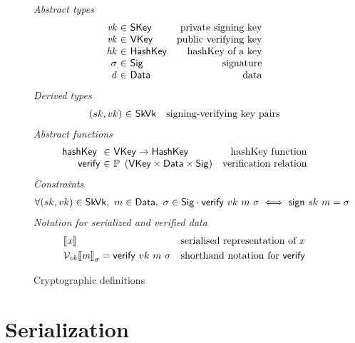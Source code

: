 \documentclass[11pt,a4paper]{article}
\newcommand{\VKey}{\type{VKey}}
\newcommand{\SKey}{\type{SKey}}
\newcommand{\HashKey}{\type{HashKey}}
\newcommand{\SkVk}{\type{SkVk}}
\newcommand{\Sig}{\type{Sig}}
\newcommand{\Data}{\type{Data}}
\newcommand{\verify}[3]{\fun{verify} ~ #1 ~ #2 ~ #3}
\newcommand{\sign}[2]{\fun{sign} ~ #1 ~ #2}
\newcommand{\serialised}[1]{\llbracket \var{#1} \rrbracket}
\newcommand{\hashKey}[1]{\fun{hashKey}~ \var{#1}}
\theoremstyle{definition}
\theoremstyle{definition}
\begin{document}
\begin{figure}
  \emph{Abstract types}
  \begin{equation*}
    \begin{array}{r@{~\in~}lr}
      \var{vk} & \SKey & \text{private signing key}\\
      \var{vk} & \VKey & \text{public verifying key}\\
      \var{hk} & \HashKey & \text{hashKey of a key}\\
      \sigma & \Sig  & \text{signature}\\
      \var{d} & \Data  & \text{data}\\
    \end{array}
  \end{equation*}
  \emph{Derived types}
  \begin{equation*}
    \begin{array}{r@{~\in~}lr}
      (sk, vk) & \SkVk & \text{signing-verifying key pairs}
    \end{array}
  \end{equation*}
  \emph{Abstract functions}
  \begin{equation*}
    \begin{array}{r@{~\in~}lr}
      \hashKey{} & \VKey \to \HashKey
      & \text{hashKey function} \\
      \fun{verify} & \powerset{\left(\VKey \times \Data \times \Sig\right)}
      & \text{verification relation}\\
    \end{array}
  \end{equation*}
  \emph{Constraints}
  \begin{align*}
    & \forall (sk, vk) \in \SkVk,~ m \in \Data,~ \sigma \in \Sig \cdot
      \verify{vk}{m}{\sigma} \iff \sign{sk}{m} = \sigma
  \end{align*}
  \emph{Notation for serialized and verified data}
  \begin{align*}
    & \serialised{x} & \text{serialised representation of } x\\
    & \mathcal{V}_{\var{vk}}{\serialised{m}}_{\sigma} = \verify{vk}{m}{\sigma}
      & \text{shorthand notation for } \fun{verify}
  \end{align*}
  \caption{Cryptographic definitions}
  \label{fig:crypto-defs}
\end{figure}

\section{Serialization}
\label{sec:serialization}
\end{document}
